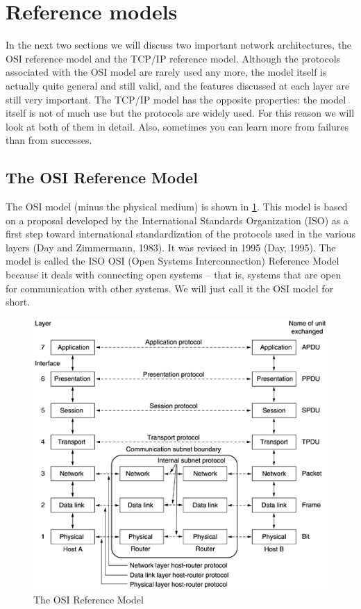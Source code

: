
\section{Reference models}
\label{sec:reference-models}

In the next two sections we will discuss two important network architectures, the OSI reference model and the TCP/IP reference model.
Although the {protocols} associated with the OSI model are rarely used any more, the {model} itself is actually quite general and still valid, and the features discussed at each layer are still very important.
The TCP/IP model has the opposite properties: the model itself is not of much use but the protocols are widely used.
For this reason we will look at both of them in detail. Also, sometimes you can learn more from failures than from successes.

\subsection{The OSI Reference Model}

The OSI model (minus the physical medium) is shown in \cref{fig:osi-model}.
This model is based on a proposal developed by the International Standards Organization (ISO) as a first step toward international standardization of the protocols used in the various layers (Day and Zimmermann, 1983).
It was revised in 1995 (Day, 1995).
The model is called the ISO OSI (Open Systems Interconnection) Reference Model because it deals with connecting open systems -- that is, systems that are open for communication with other systems.
We will just call it the OSI model for short.


\begin{figure}
   \centering
   \includegraphics[width=\textwidth]{images/01fig20.png}
   \caption{The OSI Reference Model}
   \label{fig:osi-model}
\end{figure}


